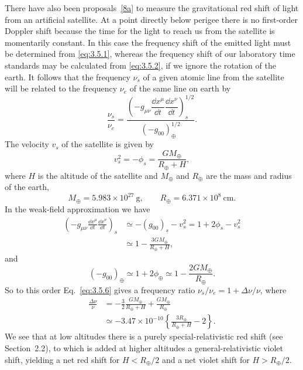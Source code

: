 There have also been proposals~\hyperref[ch3-ref-8a]{[8a]} to measure the
gravitational red shift of light from an artificial satellite. At a point
directly below perigee there is no first-order Doppler shift because the time
for the light to reach us from the satellite is momentarily constant. In
this case the frequency shift of the emitted light must be determined from
\eqref{eq:3.5.1}, whereas the frequency shift of our laboratory time
standards may be calculated from \eqref{eq:3.5.2}, if we ignore the rotation
of the earth. It follows that the frequency $\nu_s$ of a given atomic line
from the satellite will be related to the frequency $\nu_e$ of the same line
on earth by
\begin{equation}
  \frac{\nu_s}{\nu_e}
  =
  \frac{\left(
  -g_{\mu\nu}\dfrac{\dd x^\mu}{\dd t}
  \dfrac{\dd x^\nu}{\dd t}\right)_s^{1/2}}
  {(-g_{00})_\oplus^{1/2}}.
  \tag{3.5.6}\label{eq:3.5.6}
\end{equation}
The velocity $v_s$ of the satellite is given by
\[
  v_s^2=-\phi_s=\frac{GM_\oplus}{R_\oplus+H},
\]
where $H$ is the altitude of the satellite and $M_\oplus$ and $R_\oplus$
are the mass and radius of the earth,
\[
  M_\oplus=5.983\times10^{27}\ \mathrm g,
  \qquad
  R_\oplus=6.371\times10^8\ \mathrm{cm}.
\]
In the weak-field approximation we have
\begin{align*}
  \left(
  -g_{\mu\nu}\frac{\dd x^\mu}{\dd t}
  \frac{\dd x^\nu}{\dd t}\right)_s
  &\simeq -(g_{00})_s-v_s^2
  =1+2\phi_s-v_s^2
  \\
  &\simeq 1-\frac{3GM_\oplus}{R_\oplus+H},
\end{align*}
and
\[
  (-g_{00})_\oplus
  \simeq1+2\phi_\oplus
  \simeq1-\frac{2GM_\oplus}{R_\oplus}.
\]
So to this order Eq.~\eqref{eq:3.5.6} gives a frequency ratio
$\nu_s/\nu_e=1+\Delta\nu/\nu$, where
\begin{align*}
  \frac{\Delta\nu}{\nu}
  &=-\frac32\frac{GM_\oplus}{R_\oplus+H}
  +\frac{GM_\oplus}{R_\oplus}
  \\
  &\simeq-3.47\times10^{-10}
  \left\{\frac{3R_\oplus}{R_\oplus+H}-2\right\}.
\end{align*}
We see that at low altitudes there is a purely special-relativistic red shift
(see Section~2.2), to which is added at higher altitudes a
general-relativistic violet shift, yielding a net red shift for
$H<R_\oplus/2$ and a net violet shift for $H>R_\oplus/2$.

